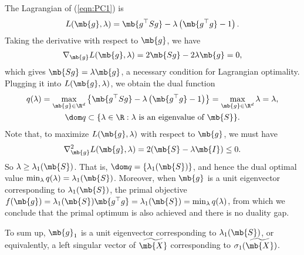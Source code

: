 \begin{exercise}
\begin{enumerate}
            \begin{solution}
                The Lagrangian of (\ref{eqn:PC1}) is
                \begin{align*}
                    L(\mb{g},\lambda) = \mb{g^\top Sg} - \lambda\left(\mb{g^\top g}-1\right).
                \end{align*}
                Taking the derivative with respect to $\mb{g}$, we have
                \begin{align*}
                    \nabla_{\mb{g}}L(\mb{g},\lambda) = 2\mb{Sg} - 2\lambda\mb{g} = 0,
                \end{align*}
                which gives $\mb{Sg}=\lambda\mb{g}$, a necessary condition for Lagrangian optimality. Plugging it into $L(\mb{g},\lambda)$, we obtain the dual function
                \begin{gather*}
                    q(\lambda) = \max_{\mb{g}\in\R^d}\left\{\mb{g^\top Sg} - \lambda\left(\mb{g^\top g}-1\right)\right\} = \max_{\mb{g}\in\R^d} \lambda = \lambda, \\ \dom q \subset \{\lambda\in\R:\text{$\lambda$ is an eigenvalue of $\mb{S}$}\}.
                \end{gather*}
                Note that, to maximize $L(\mb{g},\lambda)$ with respect to $\mb{g}$, we must have
                \begin{align*}
                    \nabla^2_{\mb{g}}L(\mb{g},\lambda) = 2(\mb{S}-\lambda\mb{I}) \le 0.
                \end{align*}
                So $\lambda \ge \lambda_1(\mb{S})$. That is, $\dom q = \{\lambda_1(\mb{S})\}$, and hence the dual optimal value $\min_\lambda q(\lambda) = \lambda_1(\mb{S})$. Moreover, when $\mb{g}$ is a unit eigenvector corresponding to $\lambda_1(\mb{S})$, the primal objective $f(\mb{g}) = \lambda_1(\mb{S}) \mb{g^\top g} = \lambda_1(\mb{S}) = \min_\lambda q(\lambda)$, from which we conclude that the primal optimum is also achieved and there is no duality gap.

                To sum up, $\mb{g}_1$ is a unit eigenvector corresponding to $\lambda_1(\mb{S})$, or equivalently, a left singular vector of $\widetilde{\mb{X}}$ corresponding to $\sigma_1(\widetilde{\mb{X}})$.
                \qedhere
            \end{solution}


\end{enumerate}
\end{exercise}
